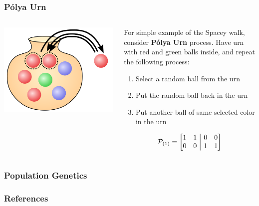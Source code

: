 \documentclass{beamer}
\begin{document}
\begin{frame}
  \frametitle{P\'{o}lya Urn}
  \begin{columns}
    \begin{column}{0.4\linewidth}
      \centering
      \includegraphics[width=\linewidth]{images/polya.png}
    \end{column}
    \begin{column}{0.6\linewidth}
      For simple example of the Spacey walk, consider \textbf{P\'{o}lya Urn} process.  Have urn with red and green balls inside, and repeat the following process:
      \begin{enumerate}
      \item Select a random ball from the urn
      \item Put the random ball back in the urn
      \item Put another ball of same selected color in the urn
      \end{enumerate}

      \[ \mathcal{P}_{\left(1\right)} =
        \left[
          \begin{array}{@{}cc|cc@{}}
            1 & 1 & 0 & 0 \\
            0 & 0 & 1 & 1
          \end{array}
        \right]
      \]
    \end{column}
  \end{columns}
\end{frame}

\begin{frame}
  \frametitle{Population Genetics}
\end{frame}

\begin{frame}
\frametitle{References}
\nocite*{}


\end{frame}
\end{document}
